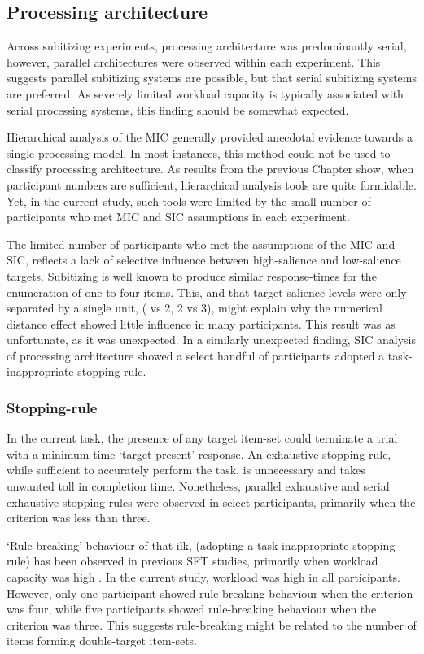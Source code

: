 \subsection{Processing architecture}
Across subitizing experiments, processing architecture was predominantly serial, however, parallel architectures were observed within each experiment. This suggests parallel subitizing systems are possible, but that serial subitizing systems are preferred. As severely limited workload capacity is typically associated with serial processing systems, this finding should be somewhat expected.

Hierarchical analysis of the MIC generally provided anecdotal evidence towards a single processing model. In most instances, this method could not be used to classify processing architecture. As results from the previous Chapter show, when participant numbers are sufficient, hierarchical analysis tools are quite formidable. Yet, in the current study, such tools were limited by the small number of participants who met MIC and SIC assumptions in each experiment.

The limited number of participants who met the assumptions of the MIC and SIC, reflects a lack of selective influence between high-salience and low-salience targets. Subitizing is well known to produce similar response-times for the enumeration of one-to-four items. This, and that target salience-levels were only separated by a single unit, ( vs 2, 2 vs 3), might explain why the numerical distance effect showed little influence in many participants. This result was as unfortunate, as it was unexpected. In a similarly unexpected finding, SIC analysis of processing architecture showed a select handful of participants adopted a task-inappropriate stopping-rule.

\color{\Red}
\subsubsection{Stopping-rule}
In the current task, the presence of any target item-set could terminate a trial with a minimum-time `target-present' response. An exhaustive stopping-rule, while sufficient to accurately perform the task, is unnecessary and takes unwanted toll in completion time. Nonetheless, parallel exhaustive and serial exhaustive stopping-rules were observed in select participants, primarily when the criterion was less than three. 

`Rule breaking' behaviour of that ilk, (\ie adopting a task inappropriate stopping-rule) has been observed in previous SFT studies, primarily when workload capacity was high \cite{bushmakin2017}. In the current study, workload was high in all participants. However, only one participant showed rule-breaking behaviour when the criterion was four, while five participants showed rule-breaking behaviour when the criterion was three. %
This suggests rule-breaking might be related to the number of items forming double-target item-sets.

